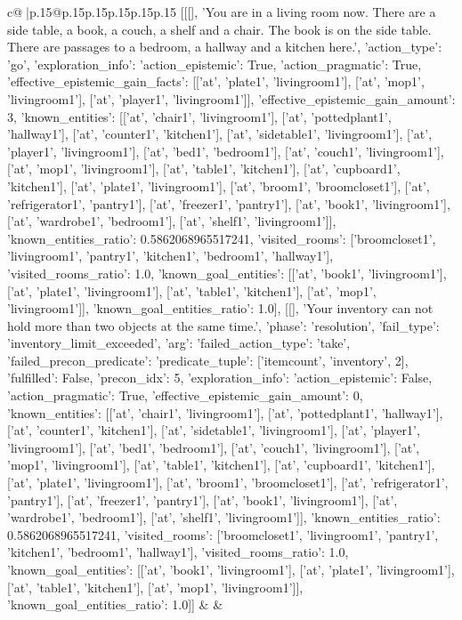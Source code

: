 \documentclass{article}
\begin{document}
{\begin{supertabular}{c@{$\;$}|p{.15\linewidth}@{}p{.15\linewidth}p{.15\linewidth}p{.15\linewidth}p{.15\linewidth}p{.15\linewidth}}
{{{	 [[[], 'You are in a living room now. There are a side table, a book, a couch, a shelf and a chair. The book is on the side table. There are passages to a bedroom, a hallway and a kitchen here.', {'action_type': 'go', 'exploration_info': {'action_epistemic': True, 'action_pragmatic': True, 'effective_epistemic_gain_facts': [['at', 'plate1', 'livingroom1'], ['at', 'mop1', 'livingroom1'], ['at', 'player1', 'livingroom1']], 'effective_epistemic_gain_amount': 3, 'known_entities': [['at', 'chair1', 'livingroom1'], ['at', 'pottedplant1', 'hallway1'], ['at', 'counter1', 'kitchen1'], ['at', 'sidetable1', 'livingroom1'], ['at', 'player1', 'livingroom1'], ['at', 'bed1', 'bedroom1'], ['at', 'couch1', 'livingroom1'], ['at', 'mop1', 'livingroom1'], ['at', 'table1', 'kitchen1'], ['at', 'cupboard1', 'kitchen1'], ['at', 'plate1', 'livingroom1'], ['at', 'broom1', 'broomcloset1'], ['at', 'refrigerator1', 'pantry1'], ['at', 'freezer1', 'pantry1'], ['at', 'book1', 'livingroom1'], ['at', 'wardrobe1', 'bedroom1'], ['at', 'shelf1', 'livingroom1']], 'known_entities_ratio': 0.5862068965517241, 'visited_rooms': ['broomcloset1', 'livingroom1', 'pantry1', 'kitchen1', 'bedroom1', 'hallway1'], 'visited_rooms_ratio': 1.0, 'known_goal_entities': [['at', 'book1', 'livingroom1'], ['at', 'plate1', 'livingroom1'], ['at', 'table1', 'kitchen1'], ['at', 'mop1', 'livingroom1']], 'known_goal_entities_ratio': 1.0}}], [[], 'Your inventory can not hold more than two objects at the same time.', {'phase': 'resolution', 'fail_type': 'inventory_limit_exceeded', 'arg': {'failed_action_type': 'take', 'failed_precon_predicate': {'predicate_tuple': ['itemcount', 'inventory', 2], 'fulfilled': False, 'precon_idx': 5}}, 'exploration_info': {'action_epistemic': False, 'action_pragmatic': True, 'effective_epistemic_gain_amount': 0, 'known_entities': [['at', 'chair1', 'livingroom1'], ['at', 'pottedplant1', 'hallway1'], ['at', 'counter1', 'kitchen1'], ['at', 'sidetable1', 'livingroom1'], ['at', 'player1', 'livingroom1'], ['at', 'bed1', 'bedroom1'], ['at', 'couch1', 'livingroom1'], ['at', 'mop1', 'livingroom1'], ['at', 'table1', 'kitchen1'], ['at', 'cupboard1', 'kitchen1'], ['at', 'plate1', 'livingroom1'], ['at', 'broom1', 'broomcloset1'], ['at', 'refrigerator1', 'pantry1'], ['at', 'freezer1', 'pantry1'], ['at', 'book1', 'livingroom1'], ['at', 'wardrobe1', 'bedroom1'], ['at', 'shelf1', 'livingroom1']], 'known_entities_ratio': 0.5862068965517241, 'visited_rooms': ['broomcloset1', 'livingroom1', 'pantry1', 'kitchen1', 'bedroom1', 'hallway1'], 'visited_rooms_ratio': 1.0, 'known_goal_entities': [['at', 'book1', 'livingroom1'], ['at', 'plate1', 'livingroom1'], ['at', 'table1', 'kitchen1'], ['at', 'mop1', 'livingroom1']], 'known_goal_entities_ratio': 1.0}}]] 
	  } 
	   } 
	   } 
	 & & \\ 
 


\end{supertabular}}
\end{document}
